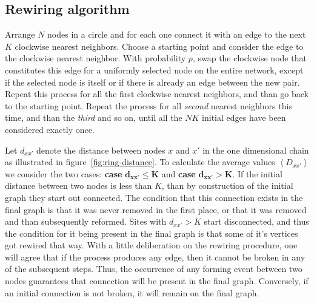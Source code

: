 \subsection{Rewiring algorithm}

Arrange $N$ nodes in a circle and for each one connect it with an edge to the next $K$ clockwise nearest neighbors. Choose a starting
point and consider the edge to the  clockwise nearest neighbor. With probability $p$, swap the clockwise node that
constitutes this edge for a uniformly selected node on the entire network, except if the selected node is itself or if there is already
an edge between the new pair. Repeat this process for all the first clockwise nearest neighbors, and than go back to the starting
point. Repeat the process for all \textit{second} nearest neighbors this time, and than the \textit{third} and so on, until all the
$NK$ initial edges have been considered exactly once.

Let $d_{xx'}$ denote the distance between nodes $x$ and $x'$ in the one dimensional chain as illustrated in
figure~\ref{fig:ring-distance}. To calculate the average values $\left< D_{xx'} \right>$ we consider the two cases: \textbf{case
}$\mathbf{d_{xx'} \leq K}$ and \textbf{case} $\mathbf{d_{xx'} > K}$. If the initial distance between two nodes is less than $K$, than
by construction of the initial graph they start out connected. The condition that this connection exists in the final graph is that it
was never removed in the first place, or that it was removed and than subsequently reformed. Sites with $d_{xx'}>K$ start disconnected,
and thus the condition for it being present in the final graph is that some of it's vertices got rewired that way. With a little
deliberation on the rewiring procedure, one will agree that if the process produces any edge, then it cannot be broken in any of the
subsequent steps. Thus, the occurrence of any forming event between two nodes guarantees that connection will be present in the final
graph. Conversely, if an initial connection is not broken, it will remain on the final graph.

